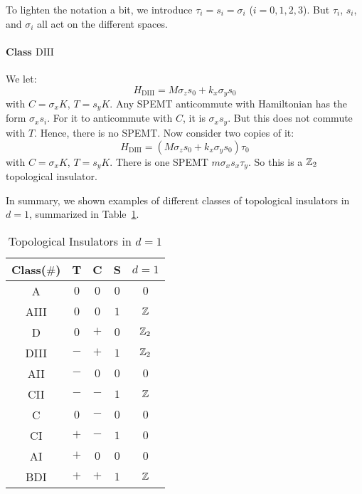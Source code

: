To lighten the notation a bit, we introduce $\tau_i=s_i=\sigma_i$ ($i=0,1,2,3$).
But $\tau_i$, $s_i$, and $\sigma_i$ all act on the different spaces.
\paragraph{Class $\mathrm{DIII}$} We let:
\begin{equation}
    H_{\mathrm{DIII}} = M \sigma_z s_0 + k_x \sigma_y s_0
\end{equation}
with $C=\sigma_x K$, $T=s_y K$. Any SPEMT anticommute with Hamiltonian has the
form $\sigma_x s_i$. For it to anticommute with $C$, it is $\sigma_x s_y$. But
this does not commute with $T$. Hence, there is no SPEMT. Now consider two
copies of it:
\begin{equation}
    H_{\mathrm{DIII}} = (M \sigma_z s_0 + k_x \sigma_y s_0)\tau_0
\end{equation}
with $C=\sigma_x K$, $T=s_y K$.  There is one SPEMT $m \sigma_xs_x\tau_y$. So
this is a $\mathbb{Z}_2$ topological insulator.

In summary, we shown examples of different classes of topological insulators in
$d=1$, summarized in Table~\ref{tab:ti-d=1}.
\begin{table}[htpb]
    \centering
    \caption{Topological Insulators in $d=1$}
    \label{tab:ti-d=1}
    \begin{tabular}{c | c c c | c }
        Class($\#$) & T & C & S & $d=1$ \\
        \hline 
        A & $0$ & $0$ & $0$ & $0$ \\
        AIII & $0$ & $0$ & $1$ & $\mathbb{Z}$ \\
        \hline
        D & $0$ & $+$ & $0$ & $\mathbb{Z}_2$ \\
        DIII & $-$ & $+$ & $1$ & $\mathbb{Z}_2$ \\
        AII & $-$ & $0$ & $0$ & $0$ \\
        CII & $-$ & $-$ & $1$ & $\mathbb{Z}$ \\
        C & $0$ & $-$ & $0$ & $0$ \\
        CI & $+$ & $-$ & $1$ & $0$ \\
        AI & $+$ & $0$ & $0$ & $0$ \\
        BDI & $+$ & $+$ & $1$ & $\mathbb{Z}$ \\
        \hline
    \end{tabular}
\end{table}
